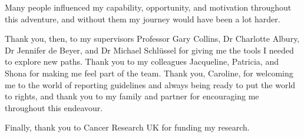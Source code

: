 Many people influenced my capability, opportunity, and motivation throughout this adventure, and without them my journey would have been a lot harder.

Thank you, then, to my supervisors Professor Gary Collins, Dr Charlotte Albury, Dr Jennifer de Beyer, and Dr Michael Schlüssel for giving me the tools I needed to explore new paths. Thank you to my colleagues Jacqueline, Patricia, and Shona for making me feel part of the team. Thank you, Caroline, for welcoming me to the world of reporting guidelines and always being ready to put the world to rights, and thank you to my family and partner for encouraging me throughout this endeavour.

Finally, thank you to Cancer Research UK for funding my research. 